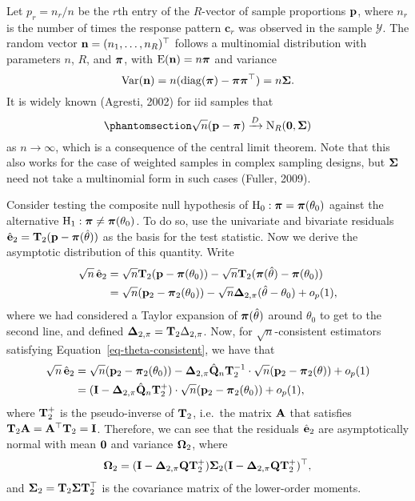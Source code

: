 \documentclass[
  letterpaper,
  DIV=11,
  numbers=noendperiod]{scrartcl}
\begin{document}
Let \(p_r = n_r / n\) be the \(r\)th entry of the \(R\)-vector of sample
proportions \({\mathbf p}\), where \(n_r\) is the number of times the response
pattern \(\mathbf c_r\) was observed in the sample \(\mathcal Y\). The
random vector \({\mathbf n} = (n_1,\dots,n_R)^\top\) follows a multinomial
distribution with parameters \(n\), \(R\), and \({\boldsymbol\pi}\), with
\(\operatorname{E}({\mathbf n})=n{\boldsymbol\pi}\) and variance \[
\operatorname{Var}({\mathbf n}) = n (\operatorname{diag}({\boldsymbol\pi}) - {\boldsymbol\pi} {\boldsymbol\pi}^\top) = n {\boldsymbol\Sigma}.
\] It is widely known (Agresti, 2002) for iid samples that
\begin{equation}\phantomsection\label{eq-clt-prop}{
\sqrt{n} (\bp - \bpi) \xrightarrow{D} {\N}_R(\bzero, \bSigma)
}\end{equation} as \(n\to\infty\), which is a consequence of the central
limit theorem. Note that this also works for the case of weighted
samples in complex sampling designs, but \({\boldsymbol\Sigma}\) need not take a
multinomial form in such cases (Fuller, 2009).

Consider testing the composite null hypothesis of
\(\text{H}_0: {\boldsymbol\pi} = {\boldsymbol\pi}(\theta_0)\) against the alternative
\(\text{H}_1:  {\boldsymbol\pi} \neq {\boldsymbol\pi}(\theta_0)\). To do so, use the univariate
and bivariate residuals \(\hat{{\mathbf e}}_2 = {\mathbf T}_2({\mathbf p} - {\boldsymbol\pi}(\hat\theta))\) as
the basis for the test statistic. Now we derive the asymptotic
distribution of this quantity. Write \[
\begin{aligned}
\sqrt n \, \hat{{\mathbf e}}_2 
&= \sqrt n {\mathbf T}_2({\mathbf p} - {\boldsymbol\pi}(\theta_0)) - \sqrt n {\mathbf T}_2({\boldsymbol\pi}(\hat\theta) - {\boldsymbol\pi}(\theta_0)) \\
&= \sqrt n ({\mathbf p}_2 - {\boldsymbol\pi}_2(\theta_0)) - \sqrt n {\boldsymbol\Delta}_{2,\pi} (\hat\theta - \theta_0) + o_p(1),
\end{aligned}
\] where we had considered a Taylor expansion of \({\boldsymbol\pi}(\hat\theta)\)
around \(\theta_0\) to get to the second line, and defined
\({\boldsymbol\Delta}_{2,\pi} = {\mathbf T}_2\Delta_{2,\pi}\). Now, for
\(\sqrt n\)-consistent estimators satisfying
Equation~\ref{eq-theta-consistent}, we have that \[
\begin{aligned}
\sqrt n \, \hat{{\mathbf e}}_2 
&= \sqrt n ({\mathbf p}_2 - {\boldsymbol\pi}_2(\theta_0)) -  {\boldsymbol\Delta}_{2,\pi} \hat{{\mathbf Q}}_n {\mathbf T}_2^{-1} \cdot \sqrt{n}({\mathbf p}_2 - {\boldsymbol\pi}_2(\theta)) + o_p(1) \\
&= ({\mathbf I} - {\boldsymbol\Delta}_{2,\pi} \hat{{\mathbf Q}}_n {\mathbf T}_2^{+}) \cdot \sqrt n ({\mathbf p}_2 - {\boldsymbol\pi}_2(\theta_0)) + o_p(1),
\end{aligned}
\] where \({\mathbf T}_2^{+}\) is the pseudo-inverse of \({\mathbf T}_2\), i.e.~the
matrix \({\mathbf A}\) that satisfies \({\mathbf T}_2 {\mathbf A} = {\mathbf A}^\top {\mathbf T}_2 = {\mathbf I}\).
Therefore, we can see that the residuals \(\hat{{\mathbf e}}_2\) are
asymptotically normal with mean \({\mathbf 0}\) and variance \({\boldsymbol\Omega}_2\),
where \[
\begin{aligned}
{\boldsymbol\Omega}_2 = ({\mathbf I} - {\boldsymbol\Delta}_{2,\pi} {\mathbf Q} {\mathbf T}_2^+) {\boldsymbol\Sigma}_2 ({\mathbf I} - {\boldsymbol\Delta}_{2,\pi}  {\mathbf Q} {\mathbf T}_2^{+})^\top,
\end{aligned}
\] and \({\boldsymbol\Sigma}_2 = {\mathbf T}_2 {\boldsymbol\Sigma} {\mathbf T}_2^\top\) is the covariance matrix
of the lower-order moments.
\end{document}
